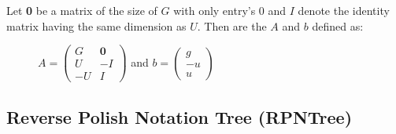 \begin{frame}
	\begin{definition}[\iterationmatrix, \iterationconstants]
		Let \textbf{0} be a matrix of the size of $G$ with only entry's 0 and $I$ denote the identity matrix having the same dimension as $U$. Then are the \iterationmatrix $A$ and \iterationconstants $b$ defined as:
		\begin{figure}[H]
			\centering
			$A = \begin{pmatrix} G & \textbf{0} \\ U & -I \\ -U & I \end{pmatrix}$ and $b = \begin{pmatrix} g \\ -u \\ u \end{pmatrix}$
		\end{figure}
	
	\end{definition}
\end{frame}

\subsection{Reverse Polish Notation Tree (RPNTree)}

